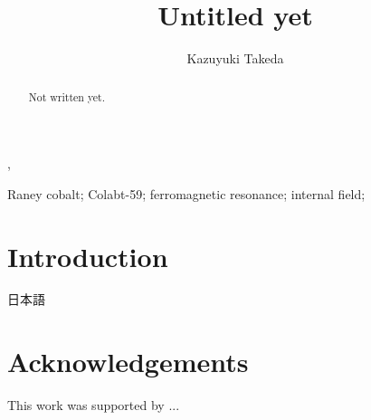 \documentclass[doublespacing]{elsart}
\begin{document}

\begin{frontmatter}
%
\title{Untitled yet}
%
\author[kyoto]{Kazuyuki Takeda},
\address[kyoto]{Division of Chemistry, Graduate School of Science, Kyoto University, 606-8502 Kyoto, Japan}
\begin{abstract}
Not written yet.
\end{abstract}

\begin{keyword}
Raney cobalt; Colabt-59; ferromagnetic resonance; internal field;
\end{keyword}
\end{frontmatter}


\clearpage

\section{Introduction}

日本語


\section*{Acknowledgements}
This work was supported by ...










\end{document}
